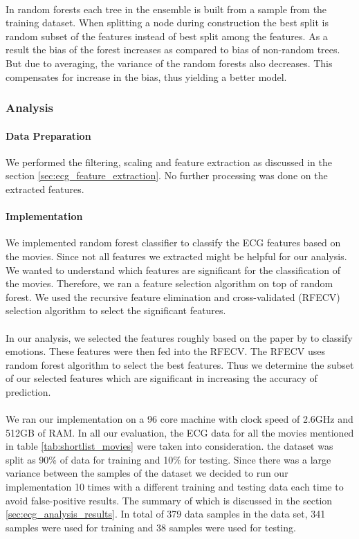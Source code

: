 \paragraph{} In random forests each tree in the ensemble is built from a sample from the training dataset. When splitting a node during construction the best split is random subset of the features instead of best split among the features. As a result the bias of the forest increases as compared to bias of non-random trees. But due to averaging, the variance of the random forests also decreases. This compensates for increase in the bias, thus yielding a better model.

\subsubsection{Analysis}
\paragraph{Data Preparation}  We performed the filtering, scaling and feature extraction as discussed in the section \ref{sec:ecg_feature_extraction}. No further processing was done on the extracted features.

\paragraph{Implementation} We implemented random forest classifier to classify the ECG features based on the movies. Since not all features we extracted might be helpful for our analysis. We wanted to understand which features are significant for the classification of the movies. Therefore, we ran a feature selection algorithm on top of random forest. We used the recursive feature elimination and cross-validated (RFECV) selection algorithm to select the significant features.
\paragraph{} In our analysis, we selected the features roughly based on the paper by \citeauthor{zhao_emotion_2016} to classify emotions. These features were then fed into the RFECV. The RFECV uses random forest algorithm to select the best features. Thus we determine the subset of our selected features which are significant in increasing the accuracy of prediction.
\paragraph{} We ran our implementation on a 96 core machine with clock speed of 2.6GHz and 512GB of RAM. In all our evaluation, the ECG data for all the movies mentioned in table \ref{tab:shortlist_movies} were taken into consideration. the dataset was split as 90\% of data for training and 10\% for testing. Since there was a large variance between the samples of the dataset we decided to run our implementation 10 times with a different training and testing data each time to avoid false-positive results. The summary of which is discussed in the section \ref{sec:ecg_analysis_results}. In total of 379 data samples in the data set, 341 samples were used for training and 38 samples were used for testing. 

